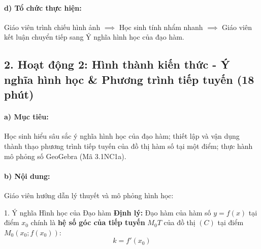 \documentclass[12pt, a4paper]{article}
\begin{document}
\paragraph{d) Tổ chức thực hiện:} Giáo viên trình chiếu hình ảnh $\implies$ Học sinh tính nhẩm nhanh $\implies$ Giáo viên kết luận chuyển tiếp sang Ý nghĩa hình học của đạo hàm.

\subsection*{2. Hoạt động 2: Hình thành kiến thức - Ý nghĩa hình học & Phương trình tiếp tuyến (18 phút)}

\paragraph{a) Mục tiêu:} Học sinh hiểu sâu sắc ý nghĩa hình học của đạo hàm; thiết lập và vận dụng thành thạo phương trình tiếp tuyến của đồ thị hàm số tại một điểm; thực hành mô phỏng số GeoGebra (Mã 3.1NC1a).

\paragraph{b) Nội dung:} Giáo viên hướng dẫn lý thuyết và mô phỏng hình học:

\begin{pedabox}{1. Ý nghĩa Hình học của Đạo hàm}
\textbf{Định lý:} Đạo hàm của hàm số $y = f(x)$ tại điểm $x_0$ chính là \textbf{hệ số góc của tiếp tuyến} $M_0T$ của đồ thị $(C)$ tại điểm $M_0(x_0; f(x_0))$:
\begin{equation}
    k = f'(x_0)
\end{equation}
\end{pedabox}
\end{document}

